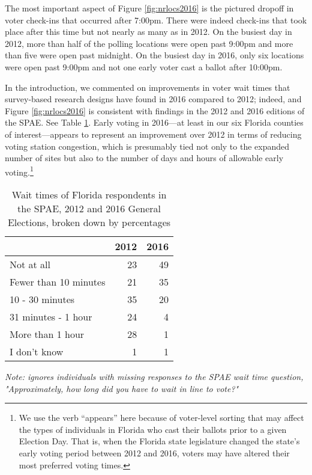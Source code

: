 \documentclass[12pt,titlepage]{article}
\begin{document}
The most important aspect of Figure \ref{fig:nrlocs2016} is the
pictured dropoff in voter check-ins that occurred after 7:00pm.  There
were indeed check-ins that took place after this time but not nearly
as many as in 2012.  On the busiest day in 2012, more than half of the
polling locations were open past 9:00pm and more than five were open
past midnight.  On the busiest day in 2016, only six locations were
open past 9:00pm and not one early voter cast a ballot after 10:00pm.

In the introduction, we commented on improvements in voter wait times
that survey-based research designs have found in 2016 compared to
2012; indeed, and Figure \ref{fig:nrlocs2016} is consistent with
findings in the 2012 \citep{spae2012} and 2016 \citep{spae2016}
editions of the SPAE.  See Table \ref{tab:floridaspae}.  Early voting
in 2016---at least in our six Florida counties of interest---appears
to represent an improvement over 2012 in terms of reducing voting
station congestion, which is presumably tied not only to the expanded
number of sites but also to the number of days and hours of allowable
early voting.\footnote{We use the verb ``appears'' here because of
  voter-level sorting that may affect the types of individuals in
  Florida who cast their ballots prior to a given Election Day.  That
  is, when the Florida state legislature changed the state's early
  voting period between 2012 and 2016, voters may have altered their
  most preferred voting times.}

\begin{table}[ht]
\centering
\caption{Wait times of Florida respondents in the SPAE, 2012 and 2016
  General Elections, broken down by percentages} 
\label{tab:floridaspae}
\begin{tabular}{lrr}
  \hline
 & 2012 & 2016 \\ 
  \hline
  Not at all &  23 &  49 \\ 
  Fewer than 10 minutes &  21 &  35 \\ 
  10 - 30 minutes &  35 &  20 \\ 
  31 minutes - 1 hour &  24 &   4 \\ 
  More than 1 hour &  28 &   1 \\ 
  I don't know &   1 &   1 \\ 
   \hline
\end{tabular}
\begin{flushleft}
  \emph{Note: ignores individuals with missing responses to the SPAE
    wait time question, "Approximately, how long did you have to wait in line to vote?"}
\end{flushleft}
\end{table}
\end{document}
